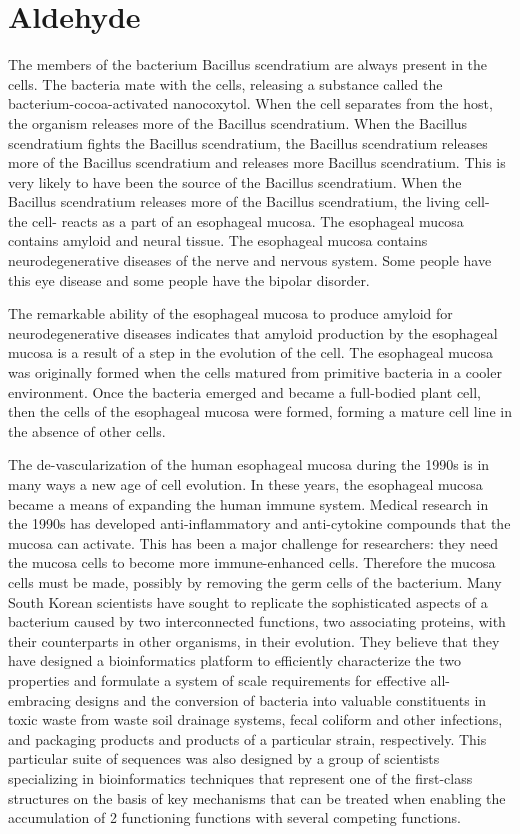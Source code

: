 \documentclass{article}
\begin{document}
\section{Aldehyde}


The members of the bacterium Bacillus scendratium are always present in the cells. The bacteria mate with the cells, releasing a substance called the bacterium-cocoa-activated nanocoxytol. When the cell separates from the host, the organism releases more of the Bacillus scendratium. When the Bacillus scendratium fights the Bacillus scendratium, the Bacillus scendratium releases more of the Bacillus scendratium and releases more Bacillus scendratium. This is very likely to have been the source of the Bacillus scendratium. When the Bacillus scendratium releases more of the Bacillus scendratium, the living cell- the cell- reacts as a part of an esophageal mucosa. The esophageal mucosa contains amyloid and neural tissue. The esophageal mucosa contains neurodegenerative diseases of the nerve and nervous system. Some people have this eye disease and some people have the bipolar disorder.

The remarkable ability of the esophageal mucosa to produce amyloid for neurodegenerative diseases indicates that amyloid production by the esophageal mucosa is a result of a step in the evolution of the cell. The esophageal mucosa was originally formed when the cells matured from primitive bacteria in a cooler environment. Once the bacteria emerged and became a full-bodied plant cell, then the cells of the esophageal mucosa were formed, forming a mature cell line in the absence of other cells.

The de-vascularization of the human esophageal mucosa during the 1990s is in many ways a new age of cell evolution. In these years, the esophageal mucosa became a means of expanding the human immune system. Medical research in the 1990s has developed anti-inflammatory and anti-cytokine compounds that the mucosa can activate. This has been a major challenge for researchers: they need the mucosa cells to become more immune-enhanced cells. Therefore the mucosa cells must be made, possibly by removing the germ cells of the bacterium. Many South Korean scientists have sought to replicate the sophisticated aspects of a bacterium caused by two interconnected functions, two associating proteins, with their counterparts in other organisms, in their evolution. They believe that they have designed a bioinformatics platform to efficiently characterize the two properties and formulate a system of scale requirements for effective all-embracing designs and the conversion of bacteria into valuable constituents in toxic waste from waste soil drainage systems, fecal coliform and other infections, and packaging products and products of a particular strain, respectively. This particular suite of sequences was also designed by a group of scientists specializing in bioinformatics techniques that represent one of the first-class structures on the basis of key mechanisms that can be treated when enabling the accumulation of 2 functioning functions with several competing functions.
\end{document}

